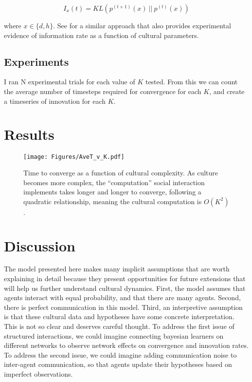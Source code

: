 \documentclass[11pt]{amsart}
\begin{document}
\begin{equation}
  I_x(t) = KL(p^{(t+1)}(x)~||~p^{(t)}(x))
\end{equation}

where $x \in \{d, h\}$. See \cite{Griffiths2013} for a similar approach that also
provides experimental evidence of information rate as a function of cultural
parameters.

\subsection{Experiments}

I ran N experimental trials for each value of $K$ tested. From this we can 
count the average number of timesteps required for convergence for each $K$,
and create a timeseries of innovation for each $K$. 


\section{Results}


\begin{figure}[H]
  \caption{Time to converge as a function of cultural complexity. As culture
  becomes more complex, the ``computation'' social interaction implements 
  takes longer and longer to converge, following a quadratic relationship,
  meaning the cultural computation is $O(K^2)$.}
  \centering
    \texttt{[image: Figures/AveT\_v\_K.pdf]}
  \label{fig:}
\end{figure}




\section{Discussion}

The model presented here makes many implicit assumptions that are worth 
explaining in detail because they present opportunities for future extensions
that will help us further understand cultural dynamics. First, the model assumes
that agents interact with equal probability, and that there are many agents.
Second, there is perfect communication in this model. 
Third, an interpretive assumption is that these cultural data and hypotheses
have some concrete interpretation. This is not so clear and deserves careful
thought. To address the first issue of structured interactions, we could imagine
connecting bayesian learners on different networks to observe network effects on
convergence and innovation rates. To address the second issue, we could imagine
adding communication noise to inter-agent communication, so that agents update
their hypotheses based on imperfect observations. 
\end{document}
